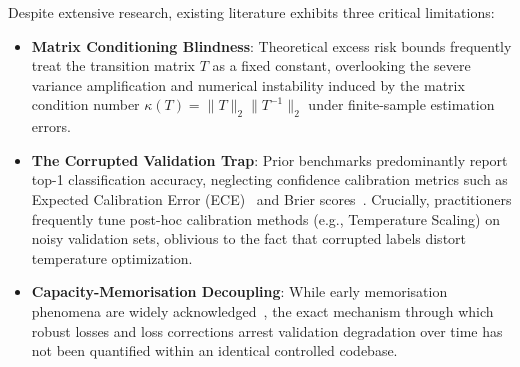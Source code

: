 \documentclass[10pt,twocolumn]{article}
\theoremstyle{definition}
\begin{document}
Despite extensive research, existing literature exhibits three critical limitations:
\begin{itemize}
    \item \textbf{Matrix Conditioning Blindness}: Theoretical excess risk bounds frequently treat the transition matrix $T$ as a fixed constant, overlooking the severe variance amplification and numerical instability induced by the matrix condition number $\kappa(T) = \|T\|_2 \|T^{-1}\|_2$ under finite-sample estimation errors.
    \item \textbf{The Corrupted Validation Trap}: Prior benchmarks predominantly report top-1 classification accuracy, neglecting confidence calibration metrics such as Expected Calibration Error (ECE)~\cite{guo2017calibration,nixon2019measuring} and Brier scores~\cite{brier1950verification}. Crucially, practitioners frequently tune post-hoc calibration methods (e.g., Temperature Scaling) on noisy validation sets, oblivious to the fact that corrupted labels distort temperature optimization.
    \item \textbf{Capacity-Memorisation Decoupling}: While early memorisation phenomena are widely acknowledged~\cite{arpit2017closer}, the exact mechanism through which robust losses and loss corrections arrest validation degradation over time has not been quantified within an identical controlled codebase.
\end{itemize}
\end{document}
